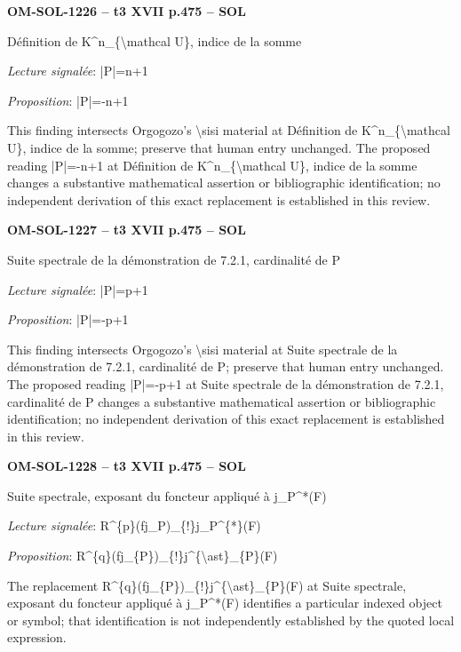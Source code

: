 \par\noindent\textbf{OM-SOL-1226 -- t3 XVII p.475 -- SOL}\par
Définition de K\textasciicircum{}n\_\{\textbackslash{}mathcal U\}, indice de la somme\par
\emph{Lecture signalée}: |P|=\allowbreak n+1\par
\emph{Proposition}: |P|=\allowbreak -n+1\par
This finding intersects Orgogozo's \textbackslash{}sisi material at Définition de K\textasciicircum{}n\_\{\textbackslash{}mathcal U\}, indice de la somme; preserve that human entry unchanged. The proposed reading |P|=\allowbreak -n+1 at Définition de K\textasciicircum{}n\_\{\textbackslash{}mathcal U\}, indice de la somme changes a substantive mathematical assertion or bibliographic identification; no independent derivation of this exact replacement is established in this review.\par
\par\noindent\textbf{OM-SOL-1227 -- t3 XVII p.475 -- SOL}\par
Suite spectrale de la démonstration de 7.2.1, cardinalité de P\par
\emph{Lecture signalée}: |P|=\allowbreak p+1\par
\emph{Proposition}: |P|=\allowbreak -p+1\par
This finding intersects Orgogozo's \textbackslash{}sisi material at Suite spectrale de la démonstration de 7.2.1, cardinalité de P; preserve that human entry unchanged. The proposed reading |P|=\allowbreak -p+1 at Suite spectrale de la démonstration de 7.2.1, cardinalité de P changes a substantive mathematical assertion or bibliographic identification; no independent derivation of this exact replacement is established in this review.\par
\par\noindent\textbf{OM-SOL-1228 -- t3 XVII p.475 -- SOL}\par
Suite spectrale, exposant du foncteur appliqué à j\_P\textasciicircum{}*(F)\par
\emph{Lecture signalée}: R\textasciicircum{}\{p\}(fj\_P)\_\{!\}j\_P\textasciicircum{}\{*\}(F)\par
\emph{Proposition}: R\textasciicircum{}\{q\}(fj\_\{P\})\_\{!\}j\textasciicircum{}\{\textbackslash{}ast\}\_\{P\}(F)\par
The replacement R\textasciicircum{}\{q\}(fj\_\{P\})\_\{!\}j\textasciicircum{}\{\textbackslash{}ast\}\_\{P\}(F) at Suite spectrale, exposant du foncteur appliqué à j\_P\textasciicircum{}*(F) identifies a particular indexed object or symbol; that identification is not independently established by the quoted local expression.\par
